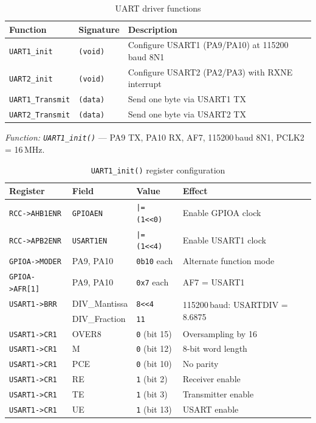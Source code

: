 \documentclass[12pt,a4paper]{article}
\begin{document}
\begin{table}[H]
\centering
\begin{tabular}{lll}
\hline
\textbf{Function} & \textbf{Signature} & \textbf{Description} \\
\hline
\texttt{UART1\_init}      & \texttt{(void)}        & Configure USART1 (PA9/PA10) at 115200\,baud 8N1 \\
\texttt{UART2\_init}      & \texttt{(void)}        & Configure USART2 (PA2/PA3) with RXNE interrupt \\
\texttt{UART1\_Transmit}  & \texttt{(data)}        & Send one byte via USART1 TX \\
\texttt{UART2\_Transmit}  & \texttt{(data)}        & Send one byte via USART2 TX \\
\hline
\end{tabular}
\caption{UART driver functions}
\end{table}

\textit{Function: \texttt{UART1\_init()}} — PA9 TX, PA10 RX, AF7, 115200\,baud 8N1, PCLK2 = 16\,MHz.

\begin{table}[H]
\centering
\begin{tabular}{llll}
\hline
\textbf{Register} & \textbf{Field} & \textbf{Value} & \textbf{Effect} \\
\hline
\texttt{RCC->AHB1ENR} & \texttt{GPIOAEN} & \texttt{|= (1<<0)}  & Enable GPIOA clock \\
\texttt{RCC->APB2ENR} & \texttt{USART1EN} & \texttt{|= (1<<4)} & Enable USART1 clock \\
\texttt{GPIOA->MODER} & PA9, PA10 & \texttt{0b10} each & Alternate function mode \\
\texttt{GPIOA->AFR[1]} & PA9, PA10 & \texttt{0x7} each & AF7 = USART1 \\
\texttt{USART1->BRR}  & DIV\_Mantissa & \texttt{8<<4} & \multirow{2}{*}{115200\,baud: USARTDIV = 8.6875} \\
                      & DIV\_Fraction & \texttt{11}   & \\
\texttt{USART1->CR1}  & OVER8 & \texttt{0} (bit 15) & Oversampling by 16 \\
\texttt{USART1->CR1}  & M     & \texttt{0} (bit 12) & 8-bit word length \\
\texttt{USART1->CR1}  & PCE   & \texttt{0} (bit 10) & No parity \\
\texttt{USART1->CR1}  & RE    & \texttt{1} (bit 2)  & Receiver enable \\
\texttt{USART1->CR1}  & TE    & \texttt{1} (bit 3)  & Transmitter enable \\
\texttt{USART1->CR1}  & UE    & \texttt{1} (bit 13) & USART enable \\
\hline
\end{tabular}
\caption{\texttt{UART1\_init()} register configuration}
\end{table}
\end{document}
